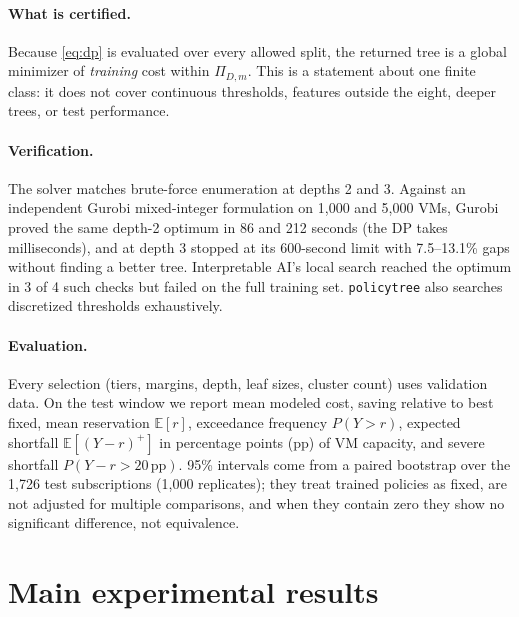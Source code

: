 \documentclass[10pt]{article}
\newcommand{\Ex}{\mathbb{E}}
\newcommand{\pp}{\,\text{pp}}
\begin{document}
\paragraph{What is certified.} Because \eqref{eq:dp} is evaluated over every allowed split, the returned tree is a global minimizer of \emph{training} cost within $\Pi_{D,m}$. This is a statement about one finite class: it does not cover continuous thresholds, features outside the eight, deeper trees, or test performance.

\paragraph{Verification.} The solver matches brute-force enumeration at depths 2 and 3. Against an independent Gurobi mixed-integer formulation on 1,000 and 5,000 VMs, Gurobi proved the same depth-2 optimum in 86 and 212 seconds (the DP takes milliseconds), and at depth 3 stopped at its 600-second limit with 7.5--13.1\% gaps without finding a better tree. Interpretable AI's local search \citep{iai} reached the optimum in 3 of 4 such checks but failed on the full training set. \texttt{policytree} \citep{sverdrup2020policytree} also searches discretized thresholds exhaustively.

\paragraph{Evaluation.} Every selection (tiers, margins, depth, leaf sizes, cluster count) uses validation data. On the test window we report mean modeled cost, saving relative to best fixed, mean reservation $\Ex[r]$, exceedance frequency $P(Y>r)$, expected shortfall $\Ex[(Y-r)^+]$ in percentage points (pp) of VM capacity, and severe shortfall $P(Y-r>20\pp)$. 95\% intervals come from a paired bootstrap over the 1,726 test subscriptions (1,000 replicates); they treat trained policies as fixed, are not adjusted for multiple comparisons, and when they contain zero they show no significant difference, not equivalence.

\section{Main experimental results}
\label{sec:results}
\end{document}
